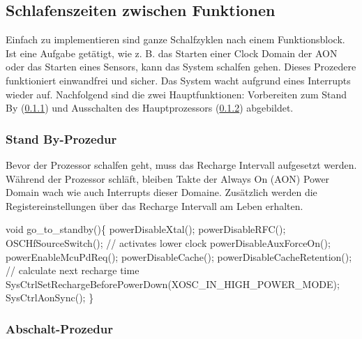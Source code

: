 \subsection{Schlafenszeiten zwischen Funktionen}
\label{sleep_funktion}

Einfach zu implementieren sind ganze Schalfzyklen nach einem Funktionsblock. Ist eine Aufgabe getätigt, wie z. B. das Starten einer Clock Domain der AON oder das Starten eines Sensors, kann das System schalfen gehen. Dieses Prozedere funktioniert einwandfrei und sicher. Das System wacht aufgrund eines Interrupts wieder auf. Nachfolgend sind die zwei Hauptfunktionen: Vorbereiten zum Stand By (\ref{vorbereiten}) und Ausschalten des Hauptprozessors (\ref{ausschalten}) abgebildet.

\subsubsection{Stand By-Prozedur}
\label{vorbereiten}

Bevor der Prozessor schalfen geht, muss das Recharge Intervall aufgesetzt werden. Während der Prozessor schläft, bleiben Takte der Always On (AON) Power Domain wach wie auch Interrupts dieser Domaine. Zusätzlich werden die Registereinstellungen über das Recharge Intervall am Leben erhalten. 
 
void go\_to\_standby()\{ 
                \linebreak 
	    powerDisableXtal(); \linebreak 
	    powerDisableRFC(); \linebreak
	    OSCHfSourceSwitch();                    // activates lower clock \linebreak
	    powerDisableAuxForceOn(); \linebreak
	    powerEnableMcuPdReq(); \linebreak
	    powerDisableCache(); \linebreak
	    powerDisableCacheRetention(); \linebreak
	            \linebreak
	    // calculate next recharge time \linebreak
	    SysCtrlSetRechargeBeforePowerDown(XOSC\_IN\_HIGH\_POWER\_MODE);   \linebreak     
	    SysCtrlAonSync(); \linebreak
                \linebreak
\} 
	    

\subsubsection{Abschalt-Prozedur}
\label{ausschalten}


